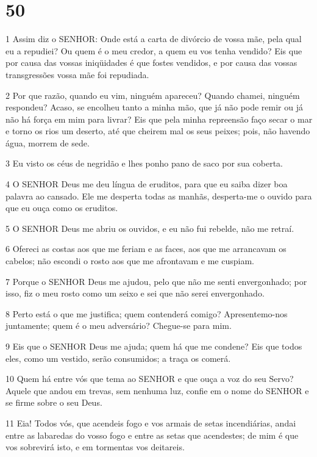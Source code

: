 \chapter{50}

\par 1 Assim diz o SENHOR: Onde está a carta de divórcio de vossa mãe, pela qual eu a repudiei? Ou quem é o meu credor, a quem eu vos tenha vendido? Eis que por causa das vossas iniqüidades é que fostes vendidos, e por causa das vossas transgressões vossa mãe foi repudiada.
\par 2 Por que razão, quando eu vim, ninguém apareceu? Quando chamei, ninguém respondeu? Acaso, se encolheu tanto a minha mão, que já não pode remir ou já não há força em mim para livrar? Eis que pela minha repreensão faço secar o mar e torno os rios um deserto, até que cheirem mal os seus peixes; pois, não havendo água, morrem de sede.
\par 3 Eu visto os céus de negridão e lhes ponho pano de saco por sua coberta.
\par 4 O SENHOR Deus me deu língua de eruditos, para que eu saiba dizer boa palavra ao cansado. Ele me desperta todas as manhãs, desperta-me o ouvido para que eu ouça como os eruditos.
\par 5 O SENHOR Deus me abriu os ouvidos, e eu não fui rebelde, não me retraí.
\par 6 Ofereci as costas aos que me feriam e as faces, aos que me arrancavam os cabelos; não escondi o rosto aos que me afrontavam e me cuspiam.
\par 7 Porque o SENHOR Deus me ajudou, pelo que não me senti envergonhado; por isso, fiz o meu rosto como um seixo e sei que não serei envergonhado.
\par 8 Perto está o que me justifica; quem contenderá comigo? Apresentemo-nos juntamente; quem é o meu adversário? Chegue-se para mim.
\par 9 Eis que o SENHOR Deus me ajuda; quem há que me condene? Eis que todos eles, como um vestido, serão consumidos; a traça os comerá.
\par 10 Quem há entre vós que tema ao SENHOR e que ouça a voz do seu Servo? Aquele que andou em trevas, sem nenhuma luz, confie em o nome do SENHOR e se firme sobre o seu Deus.
\par 11 Eia! Todos vós, que acendeis fogo e vos armais de setas incendiárias, andai entre as labaredas do vosso fogo e entre as setas que acendestes; de mim é que vos sobrevirá isto, e em tormentas vos deitareis.


